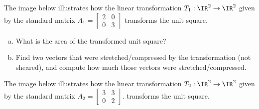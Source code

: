 \begin{applicationActivities}

\begin{activity}{5}
The image below illustrates how the linear transformation
$T_1 : \IR^2 \rightarrow \IR^2$ given by the
standard matrix $A_1 = \begin{bmatrix} 2 & 0 \\ 0 & 3 \end{bmatrix}$
transforms the unit square.

\begin{center}
\end{center}

\begin{enumerate}[(a)]
\item What is the area of the transformed unit square?
\item Find two vectors that were stretched/compressed by the
      transformation (not sheared),
      and compute how much those vectors were stretched/compressed.
\end{enumerate}

\end{activity}


\begin{activity}{5}
The image below illustrates how the linear transformation
$T_2 : \IR^2 \rightarrow \IR^2$ given by the
standard matrix $A_2 = \begin{bmatrix} 3 & 3 \\ 0 & 2 \end{bmatrix}$.
transforms the unit square.


\end{activity}
\end{applicationActivities}
